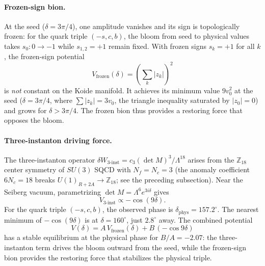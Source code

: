 \documentclass[12pt,a4paper]{article}
\begin{document}
\paragraph{Frozen-sign bion.}
At the seed ($\delta = 3\pi/4$), one amplitude vanishes and its sign
is topologically frozen: for the quark triple $(-s,c,b)$, the
bloom from seed to physical values takes
$s_0: 0 \to -1$ while $s_{1,2} = +1$ remain fixed.
With frozen signs $s_k = +1$ for all $k$, the frozen-sign potential
\begin{equation*}
  V_{\mathrm{frozen}}(\delta) = \left(\sum_k |z_k|\right)^2
\end{equation*}
is \emph{not} constant on the Koide manifold.  It achieves its
minimum value $9v_0^2$ at the seed ($\delta = 3\pi/4$, where
$\sum |z_k| = 3v_0$, the triangle inequality saturated by
$|z_0| = 0$) and grows for $\delta > 3\pi/4$.
The frozen bion thus provides a restoring force that opposes the bloom.

\paragraph{Three-instanton driving force.}
The three-instanton operator
$\delta W_{3\text{-inst}} = c_3(\det M)^3/\Lambda^{18}$
arises from the $\mathbb{Z}_{18}$ center symmetry of $SU(3)$ SQCD
with $N_f = N_c = 3$ (the anomaly coefficient $6N_c = 18$
breaks $U(1)_{R+2A} \to \mathbb{Z}_{18}$; see the preceding subsection).
Near the Seiberg vacuum, parametrizing
$\det M = \Lambda^6 e^{3i\delta}$ gives
\begin{equation*}
  V_{3\text{-inst}} \propto -\cos(9\delta).
\end{equation*}
For the quark triple $(-s,c,b)$, the observed phase is
$\delta_{\mathrm{phys}} = 157.2^\circ$.
The nearest minimum of $-\cos(9\delta)$ is at $\delta = 160^\circ$,
just $2.8^\circ$ away.
The combined potential
\begin{equation*}
  V(\delta) = A\,V_{\mathrm{frozen}}(\delta) + B\,(-\cos 9\delta)
\end{equation*}
has a stable equilibrium at the physical phase for
$B/A = -2.07$: the three-instanton term drives the bloom outward
from the seed, while the frozen-sign bion provides the restoring
force that stabilizes the physical triple.
\end{document}

